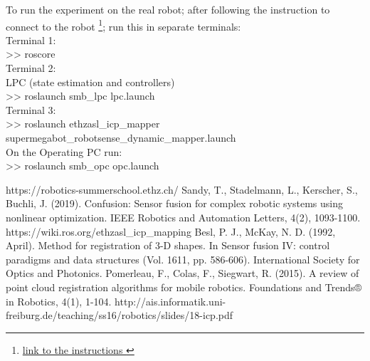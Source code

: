 \documentclass[a4paper,12pt]{article}
\newcommand{\grayhl}[1]{{\fontfamily{cmss}\selectfont  \colorbox{gray!30}{>> #1}}}
\begin{document}
\newpage
To run the experiment on the real robot; after following the instruction to connect to the robot \footnote{\href{https://drive.google.com/file/d/1zAdCP-8CdNpKgCalGuF-PEPpDxUV0_GZ/view}{link to the instructions }}; run this in separate terminals:\\
Terminal 1:\\
\grayhl{roscore}\\
Terminal 2:\\
LPC (state estimation and controllers)\\
\grayhl{roslaunch smb\_lpc lpc.launch}\\
Terminal 3:\\
\grayhl{roslaunch ethzasl\_icp\_mapper supermegabot\_robotsense\_dynamic\_mapper.launch}\\

On the Operating PC run:\\
\grayhl{roslaunch smb\_opc opc.launch}
\newpage
\begin{thebibliography}{9}
     https://robotics-summerschool.ethz.ch/
 Sandy, T., Stadelmann, L., Kerscher, S., Buchli, J. (2019). Confusion: Sensor fusion for complex robotic systems using nonlinear optimization. IEEE Robotics and Automation Letters, 4(2), 1093-1100.
 https://wiki.ros.org/ethzasl\_icp\_mapping
 Besl, P. J.,  McKay, N. D. (1992, April). Method for registration of 3-D shapes. In Sensor fusion IV: control paradigms and data structures (Vol. 1611, pp. 586-606). International Society for Optics and Photonics.
 Pomerleau, F., Colas, F.,  Siegwart, R. (2015). A review of point cloud registration algorithms for mobile robotics. Foundations and Trends® in Robotics, 4(1), 1-104.
 http://ais.informatik.uni-freiburg.de/teaching/ss16/robotics/slides/18-icp.pdf


\end{thebibliography}
\end{document}
